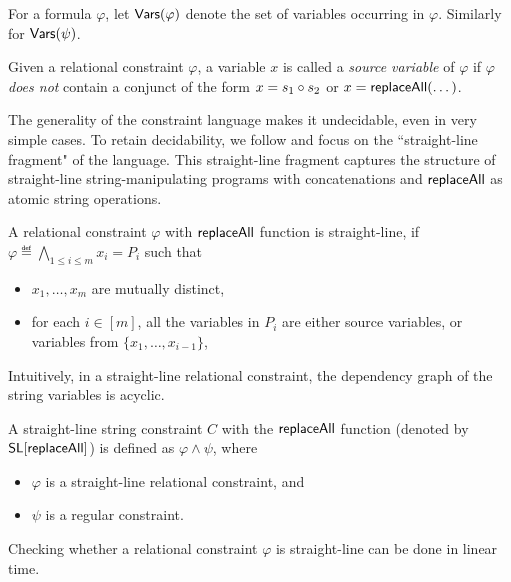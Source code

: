 For a formula $\varphi$, let $\mathsf{Vars}(\varphi)$ denote the set of variables occurring in $\varphi$. Similarly for $\mathsf{Vars}(\psi)$.



Given a relational constraint $\varphi$, a variable $x$ is called a \emph{source variable} of $\varphi$ if $\varphi$ \emph{does not} contain a conjunct of the form $x = s_1 \circ s_2$ or $x = \mathsf{replaceAll}(\dots)$.

 
The generality of the constraint language makes it undecidable,
even in very simple cases. To retain decidability, we follow \cite{LB16} and focus on the ``straight-line fragment" of the language. This straight-line fragment captures the structure of straight-line string-manipulating
programs with concatenations and $\mathsf{replaceAll}$ as atomic string operations.  

\begin{definition}
	A relational constraint $ \varphi$ with $\mathsf{replaceAll}$ function is straight-line, if $\varphi \eqdef \bigwedge \limits_{1 \le i \le m} x_i = P_i$ such that
	\begin{itemize}
		\item $x_1,\dots, x_m$ are mutually distinct,
		\item for each $i \in [m]$, all the variables in $P_i$ are either source variables, or variables from $\{x_1,\dots, x_{i-1}\}$,
	\end{itemize}
\end{definition}
Intuitively, in a straight-line relational constraint, the dependency graph of the string variables is acyclic.


\begin{definition}
	A straight-line string constraint $C$ with the $\mathsf{replaceAll}$ function (denoted by $\mathsf{SL}[\mathsf{replaceAll}]$)  is defined as $ \varphi \wedge \psi$,  where 
	\begin{itemize}
		\item $\varphi$ is a straight-line relational constraint,  and
		\item $\psi$ is a regular constraint.
	\end{itemize}
\end{definition}

\begin{remark}
Checking whether a relational constraint $\varphi$ is straight-line can be done in linear time. 
\end{remark}

